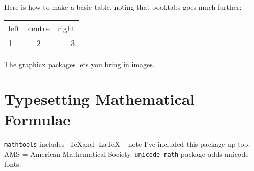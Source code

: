 \documentclass{article}
\begin{document}
Here is how to make a basic table, noting that booktabs goes much further:

\begin{tabular}{lcr}
left & centre & right \\
1 & 2 & 3 \\
\end{tabular}

The graphicx packages lets you bring in images.

\section{Typesetting Mathematical
Formulae}

\verb|mathtools| includes \AmS-\TeX and \AmS-\LaTeX \ - note I've included this package up top. AMS = American Mathematical Society. \verb|unicode-math| package adds unicode fonts.
\end{document}
